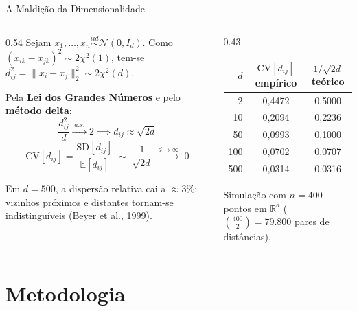 \documentclass[aspectratio=169,11pt]{beamer}
\begin{document}
\begin{frame}{A Maldição da Dimensionalidade}
  \begin{columns}[c]
    \begin{column}{0.54\textwidth}
      Sejam $x_1, \dots, x_n \overset{iid}{\sim} \mathcal{N}(0, I_d)$. Como
      $(x_{ik} - x_{jk})^2 \sim 2\chi^2(1)$, tem-se $d_{ij}^2 = \|x_i - x_j\|_2^2 \sim 2\chi^2(d)$.

      \medskip
      Pela \textbf{Lei dos Grandes Números} e pelo \textbf{método delta}:
      \[
        \frac{d_{ij}^2}{d} \xrightarrow{\;a.s.\;} 2
        \implies d_{ij} \approx \sqrt{2d}
      \]
      \[
        \text{CV}[d_{ij}] = \frac{\text{SD}[d_{ij}]}{\mathbb{E}[d_{ij}]}
        \;\sim\; \frac{1}{\sqrt{2d}} \;\xrightarrow{d \to \infty}\; 0
      \]

      \small
      Em $d = 500$, a dispersão relativa cai a $\approx 3\%$: vizinhos próximos
      e distantes tornam-se indistinguíveis (Beyer et al., 1999).
    \end{column}
    \begin{column}{0.43\textwidth}
      \begin{table}
        \centering
        \small
        \begin{tabular}{rcc}
          \toprule
          $d$ & $\text{CV}[d_{ij}]$ empírico & $1/\sqrt{2d}$ teórico \\
          \midrule
            2 & 0{,}4472 & 0{,}5000 \\
           10 & 0{,}2094 & 0{,}2236 \\
           50 & 0{,}0993 & 0{,}1000 \\
          100 & 0{,}0702 & 0{,}0707 \\
          500 & 0{,}0314 & 0{,}0316 \\
          \bottomrule
        \end{tabular}
      \end{table}
      \centering\scriptsize\textcolor{ufmggray}{%
        Simulação com $n = 400$ pontos em $\mathbb{R}^d$ ($\binom{400}{2} = 79{.}800$ pares de distâncias).}
    \end{column}
  \end{columns}
\end{frame}

\section{Metodologia}
\end{document}

